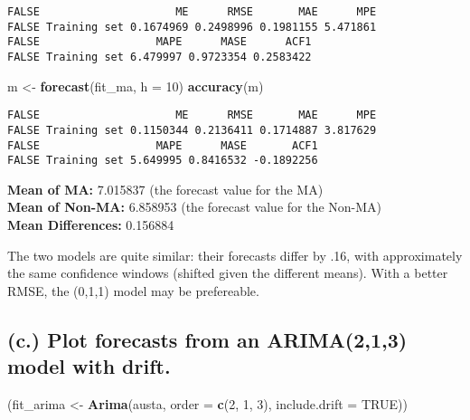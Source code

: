 \documentclass[openany]{book}
\newenvironment{Shaded}{\begin{snugshade}}{\end{snugshade}}
\newcommand{\DataTypeTok}[1]{\textcolor[rgb]{0.13,0.29,0.53}{#1}}
\newcommand{\DecValTok}[1]{\textcolor[rgb]{0.00,0.00,0.81}{#1}}
\newcommand{\KeywordTok}[1]{\textcolor[rgb]{0.13,0.29,0.53}{\textbf{#1}}}
\newcommand{\NormalTok}[1]{#1}
\newcommand{\OperatorTok}[1]{\textcolor[rgb]{0.81,0.36,0.00}{\textbf{#1}}}
\newcommand{\OtherTok}[1]{\textcolor[rgb]{0.56,0.35,0.01}{#1}}
\newcommand{\StringTok}[1]{\textcolor[rgb]{0.31,0.60,0.02}{#1}}
\begin{document}
\begin{verbatim}
FALSE                     ME      RMSE       MAE      MPE
FALSE Training set 0.1674969 0.2498996 0.1981155 5.471861
FALSE                  MAPE      MASE      ACF1
FALSE Training set 6.479997 0.9723354 0.2583422
\end{verbatim}

\begin{Shaded}
\begin{Highlighting}[]
\NormalTok{m <-}\StringTok{ }\KeywordTok{forecast}\NormalTok{(fit_ma, }\DataTypeTok{h =} \DecValTok{10}\NormalTok{)}
\KeywordTok{accuracy}\NormalTok{(m)}
\end{Highlighting}
\end{Shaded}

\begin{verbatim}
FALSE                     ME      RMSE       MAE      MPE
FALSE Training set 0.1150344 0.2136411 0.1714887 3.817629
FALSE                  MAPE      MASE       ACF1
FALSE Training set 5.649995 0.8416532 -0.1892256
\end{verbatim}

\begin{Shaded}
\end{Shaded}

\textbf{Mean of MA:} 7.015837 (the forecast value for the MA)\\
\textbf{Mean of Non-MA:} 6.858953 (the forecast value for the Non-MA)\\
\textbf{Mean Differences:} 0.156884

The two models are quite similar: their forecasts differ by .16, with approximately the same confidence windows (shifted given the different means). With a better RMSE, the (0,1,1) model may be prefereable.

\hypertarget{c.-plot-forecasts-from-an-arima213-model-with-drift.}{%
\subsection{(c.) Plot forecasts from an ARIMA(2,1,3) model with drift.}\label{c.-plot-forecasts-from-an-arima213-model-with-drift.}}

\begin{Shaded}
\begin{Highlighting}[]
\NormalTok{(fit_arima <-}\StringTok{ }\KeywordTok{Arima}\NormalTok{(austa, }\DataTypeTok{order =} \KeywordTok{c}\NormalTok{(}\DecValTok{2}\NormalTok{, }\DecValTok{1}\NormalTok{, }\DecValTok{3}\NormalTok{), }\DataTypeTok{include.drift =} \OtherTok{TRUE}\NormalTok{))}
\end{Highlighting}
\end{Shaded}
\end{document}

